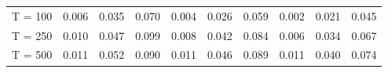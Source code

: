 % 
\begin{tabular}{cccccccccc}
  \hline
  \hline
T = 100 & 0.006 & 0.035 & 0.070 & 0.004 & 0.026 & 0.059 & 0.002 & 0.021 & 0.045 \\ 
  T = 250 & 0.010 & 0.047 & 0.099 & 0.008 & 0.042 & 0.084 & 0.006 & 0.034 & 0.067 \\ 
  T = 500 & 0.011 & 0.052 & 0.090 & 0.011 & 0.046 & 0.089 & 0.011 & 0.040 & 0.074 \\ 
   \hline
\end{tabular}
